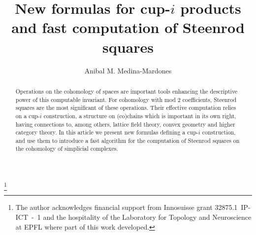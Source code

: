 \documentclass{amsart}
\theoremstyle{definition}
\begin{document}
	
	\title{New formulas for cup-$i$ products and fast computation of Steenrod squares}
	\author[Anibal Medina-Mardones]{Anibal M. Medina-Mardones}
	\address{Max Planck Institute for Mathematics, Bonn, Germany}
	\address{Department of Mathematics, University of Notre, Notre Dame, IN, USA}
	\thanks{The author acknowledges financial support from Innosuisse grant \mbox{32875.1 IP-ICT - 1} and the hospitality of the Laboratory for Topology and Neuroscience at EPFL where part of this work developed.}
	
	\begin{abstract}
		Operations on the cohomology of spaces are important tools enhancing the descriptive power of this computable invariant.
		For cohomology with mod 2 coefficients, Steenrod squares are the most significant of these operations.
		Their effective computation relies on a cup-$i$ construction, a structure on (co)chains which is important in its own right, having connections to, among others, lattice field theory, convex geometry and higher category theory.
		In this article we present new formulas defining a cup-$i$ construction, and use them to introduce a fast algorithm for the computation of Steenrod squares on the cohomology of simplicial complexes.
	\end{abstract}
	
	\maketitle
	\tableofcontents	
	
	
	
	
	
	
	
	
	
	
	
\end{document}
